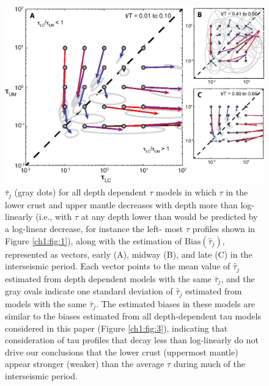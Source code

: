 \begin{figure}
\includegraphics{ch1/figures/AuxFigure4.eps}
\caption{$\bar{\tau}_j$ (gray dots) for all depth dependent $\tau$
models in which $\tau$ in the lower crust and upper mantle decreases
with depth more than log-linearly (i.e., with $\tau$ at any depth
lower than would be predicted by a log-linear decrease, for instance
the left- most $\tau$ profiles shown in Figure \ref{ch1:fig:1}), along
with the estimation of $\mathrm{Bias}(\hat{\tau}_j)$, represented as
vectors, early (A), midway (B), and late (C) in the interseismic
period.  Each vector points to the mean value of $\hat{\tau}_j$
estimated from depth dependent models with the same $\bar{\tau}_j$,
and the gray ovals indicate one standard deviation of $\hat{\tau}_j$
estimated from models with the same $\bar{\tau}_j$.  The estimated
biases in these models are similar to the biases estimated from all
depth-dependent tau models considered in this paper (Figure
\ref{ch1:fig:3}), indicating that consideration of tau profiles that
decay less than log-linearly do not drive our conclusions that the
lower crust (uppermost mantle) appear stronger (weaker) than the
average $\tau$ during much of the interseismic period.}
\label{ch1:fig:A4}
\end{figure}


